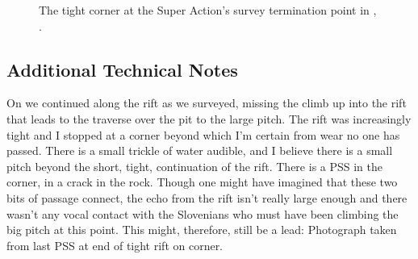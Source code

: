\begin{figure}[t!]
\checkoddpage \ifoddpage \forcerectofloat \else \forceversofloat \fi
    \centering
 \caption{The tight corner at the Super Action's survey termination point in , . } \label{tight rift termination M2}
\end{figure}


\subsection{Additional Technical Notes}

On  we continued along the rift as we surveyed, missing the climb up into the rift that leads to the traverse over the pit to the large pitch. The rift was increasingly tight and I stopped at a corner beyond which I'm certain from wear no one has passed. There is a small trickle of water audible, and I believe there is a small pitch beyond the short, tight, continuation of the rift. There is a PSS in the corner, in a crack in the rock. Though one might have imagined that these two bits of passage connect, the echo from the rift isn't really large enough and there wasn't any vocal contact with the Slovenians who must have been climbing the big pitch at this point. This might, therefore, still be a lead: Photograph taken from last PSS at end of tight rift on corner.
